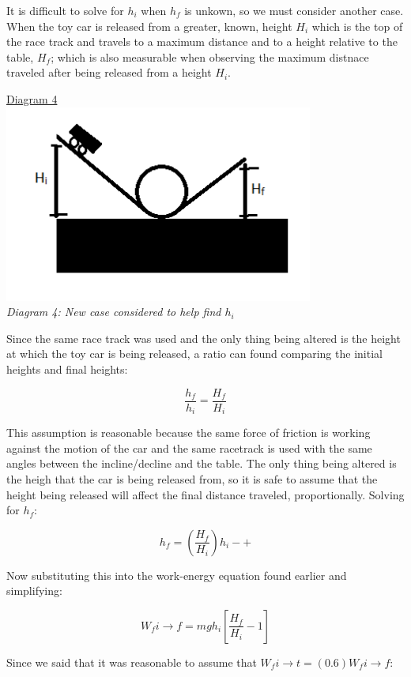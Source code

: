 \documentclass[aps,letterpaper,11pt]{revtex4}
\begin{document}
It is difficult to solve for $h_i$ when $h_f$ is unkown, so we must consider another case. When the toy car is released from a greater, known, height $H_i$ which is the top of the race track and travels to a maximum distance and to a height relative to the table, $H_f$; which is also measurable when observing the maximum distnace traveled after being released from a height $H_i$.

\begin{center}
\underline{Diagram 4}\\
\includegraphics[width = 4in]{NEWCASE.png}\\
\textit{Diagram 4: New case considered to help find $h_i$}\\
\end{center}

Since the same race track was used and the only thing being altered is the height at which the toy car is being released, a ratio can found comparing the initial heights and final heights: 

$$ \frac{h_f}{h_i} = \frac{H_f}{H_i}$$

This assumption is reasonable because the same force of friction is working against the motion of the car and the same racetrack is used with the same angles between the incline/decline and the table. The only thing being altered is the heigh that the car is being released from, so it is safe to assume that the height being released will affect the final distance traveled, proportionally. Solving for $h_f$:

$$ h_f = (\frac{H_f}{H_i})h_i-+$$

Now substituting this into the work-energy equation found earlier and simplifying:

$$ W_f i \rightarrow f = mgh_i[\frac{H_f}{H_i}-1]$$

Since we said that it was reasonable to assume that $W_f i \rightarrow t = (0.6)W_f i \rightarrow f$:
\end{document}
